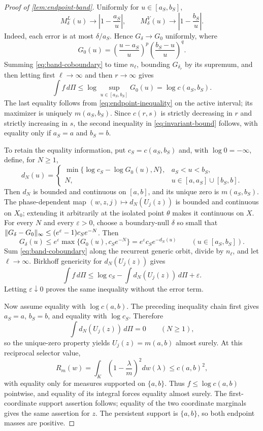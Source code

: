 \documentclass[letterpaper,twoside]{article}
\begin{document}
\begin{proof}[Proof of \cref{lem:endpoint-band}]
Uniformly for $u\in[a_S,b_S]$,
\[
 M^L_\delta(u)\longrightarrow\left|1-\frac{a_S}{u}\right|,
 \qquad
 M^V_\delta(u)\longrightarrow\left|1-\frac{b_S}{u}\right|.
\]
Indeed, each error is at most $\delta/a_S$.  Hence
$G_\delta\to G_0$ uniformly, where
\[
 G_0(u)=
 \left(\frac{u-a_S}{u}\right)^p
 \left(\frac{b_S-u}{u}\right)^q.
\]
Summing \eqref{eq:band-coboundary} to time $n_\ell$, bounding
$G_{\delta_r}$ by its supremum, and then letting first $\ell\to\infty$ and
then $r\to\infty$ gives
\[
 \int f\,d\Pi
 \le \log\sup_{u\in[a_S,b_S]}G_0(u)
 =\log c(a_S,b_S).
\]
The last equality follows from \eqref{eq:endpoint-inequality} on the active
interval; its maximizer is uniquely $m(a_S,b_S)$.  Since $c(r,s)$ is strictly
decreasing in $r$ and strictly increasing in $s$, the second inequality in
\eqref{eq:invariant-bound} follows, with equality only if $a_S=a$ and
$b_S=b$.

To retain the equality information, put $c_S=c(a_S,b_S)$ and, with
$\log0=-\infty$, define, for $N\ge1$,
\[
 d_N(u)=
 \begin{cases}
  \min\{\log c_S-\log G_0(u),N\},&a_S<u<b_S,\\
  N,&u\in[a,a_S]\cup[b_S,b].
 \end{cases}
\]
Then $d_N$ is bounded and continuous on $[a,b]$, and its unique zero is
$m(a_S,b_S)$.  The phase-dependent map
$(w,z,j)\mapsto d_N(U_j(z))$ is bounded and continuous on $X_0$; extending it
arbitrarily at the isolated point $\theta$ makes it continuous on $X$.
For every $N$ and every $\varepsilon>0$, choose a boundary-null $\delta$
so small that
$\lVert G_\delta-G_0\rVert_\infty\le(e^\varepsilon-1)c_Se^{-N}$.  Then
\begin{equation}\label{eq:defect-comparison}
 G_\delta(u)
 \le e^\varepsilon\max\{G_0(u),c_Se^{-N}\}
 =e^\varepsilon c_Se^{-d_N(u)}
 \qquad(u\in[a_S,b_S]).
\end{equation}
Sum \eqref{eq:band-coboundary} along the recurrent generic orbit, divide by
$n_\ell$, and let $\ell\to\infty$.  Birkhoff genericity for
$d_N(U_j(z))$ gives
\[
 \int f\,d\Pi
 \le \log c_S-
 \int d_N(U_j(z))\,d\Pi+\varepsilon.
\]
Letting $\varepsilon\downarrow0$ proves the same inequality without the
error term.

Now assume equality with $\log c(a,b)$.  The preceding inequality chain first
gives $a_S=a$, $b_S=b$, and equality with $\log c_S$.  Therefore
\[
 \int d_N(U_j(z))\,d\Pi=0
 \qquad(N\ge1),
\]
so the unique-zero property yields $U_j(z)=m(a,b)$ almost surely.  At this
reciprocal selector value,
\[
 R_m(w)=\int_K\left(1-\frac\lambda m\right)^2dw(\lambda)
 \le c(a,b)^2,
\]
with equality only for measures supported on $\{a,b\}$.  Thus
$f\le\log c(a,b)$ pointwise, and equality of its integral forces equality
almost surely.  The first-coordinate support assertion follows; equality of
the two coordinate marginals gives the same assertion for $z$.  The persistent
support is $\{a,b\}$, so both endpoint masses are positive.
\end{proof}
\end{document}
